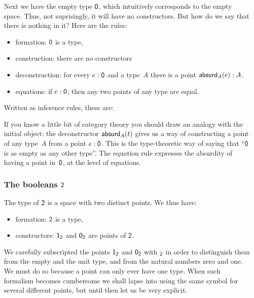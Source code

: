 \documentclass{article}
\begin{document}
Next we have the empty type $\mathsf{0}$, which intuitively corresponds to the empty
space. Thus, not suprisingly, it will have no constructors. But how do we say
that there is nothing in it? Here are the rules:
%
\begin{itemize}
\item formation: $\mathsf{0}$ is a type,
\item construction: there are no constructors
\item deconstruction: for every $e : \mathsf{0}$ and a type~$A$ there is a point $\mathsf{absurd}_{A}(e) : A$.
\item equations: if $e : \mathsf{0}$, then any two points of any type are equal.
\end{itemize}
%
Written as inference rules, these are:
%
%
If you know a little bit of category theory you should draw an analogy with the
initial object: the deconstructor $\mathsf{absurd}_{A}(t)$ gives us a way of constructing
a point of any type~$A$ from a point $e : \mathsf{0}$. This is the type-theoretic
way of saying that ``$\mathsf{0}$ is as empty as any other type''. The equation rule
expresses the absurdity of having a point in~$\mathsf{0}$, at the level of
equations.

\subsubsection{The booleans $\mathsf{2}$}

The type of $\mathsf{2}$ is a space with two distinct points. We thus have:
%
\begin{itemize}
\item formation: $\mathsf{2}$ is a type,
\item constructors: $\mathsf{1}_{\mathsf{2}}$ and $\mathsf{0}_{\mathsf{2}}$ are points of $\mathsf{2}$.
\end{itemize}
%
We carefully subscripted the points $\mathsf{1}_{\mathsf{2}}$ and $\mathsf{0}_{\mathsf{2}}$ with ${}_{\mathsf{2}}$ in order
to distinguish them from the empty and the unit type, and from the natural
numbers zero and one. We must do so because a point can only ever have one type.
When such formalism becomes cumbersome we shall lapse into using the same symbol
for several different points, but until then let us be very explicit.
\end{document}
